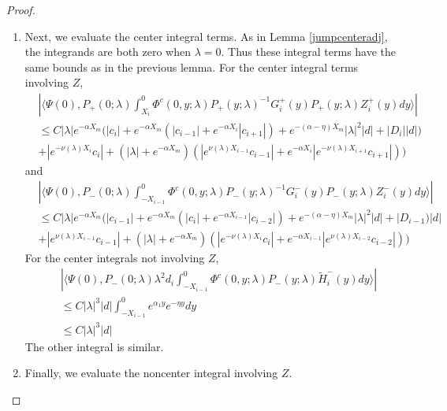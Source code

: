 \documentclass[thesis.tex]{subfiles}
\begin{document}
\begin{lemma}
\begin{proof}
\begin{enumerate}
\item Next, we evaluate the center integral terms. As in Lemma \ref{jumpcenteradj}, the integrands are both zero when $\lambda = 0$. Thus these integral terms have the same bounds as in the previous lemma. For the center integral terms involving $Z$,
\begin{align*}
&\left| \langle \Psi(0), P_+(0; \lambda) \int_{X_i}^0 \Phi^c(0, y; \lambda) P_+(y; \lambda)^{-1} G_i^+(y) P_+(y; \lambda) Z_i^+(y) dy \rangle \right| \\
&\leq C |\lambda| e^{-\alpha X_m}\Big(|c_i| + e^{-\alpha X_m}(|c_{i-1}| + e^{-\alpha X_i} |c_{i+1}|) + e^{-(\alpha - \eta) X_m}|\lambda|^2|d| + |D_i||d|) \\
&+ |e^{-\nu(\lambda)X_i} c_i| + (|\lambda| + e^{-\alpha X_m})(|e^{\nu(\lambda)X_{i-1}} c_{i-1}| + e^{-\alpha X_i} |e^{-\nu(\lambda)X_{i+1}} c_{i+1}|)\Big)
\end{align*}
and
\begin{align*}
&\left| \langle \Psi(0), P_-(0; \lambda) \int_{-X_{i-1}}^0 \Phi^c(0, y; \lambda) P_-(y; \lambda)^{-1} G_i^-(y) P_-(y; \lambda)Z_i^-(y) dy \rangle \right| \\
&\leq C |\lambda| e^{-\alpha X_m} \Big(|c_{i-1}| + e^{-\alpha X_m}(|c_i| + e^{-\alpha X_{i-1}} |c_{i-2}|) + e^{-(\alpha - \eta) X_m}|\lambda|^2|d| + |D_{i-1})|d| \\
&+ |e^{\nu(\lambda)X_{i-1}}c_{i-1}| + (|\lambda| + e^{-\alpha X_m})(|e^{-\nu(\lambda)X_i} c_i| + e^{-\alpha X_{i-1}} |e^{\nu(\lambda)X_{i-2}} c_{i-2}|)\Big)
\end{align*}
For the center integrals not involving $Z$, 
\begin{align*}
&\left| \langle \Psi(0), P_-(0; \lambda) \lambda^2 d_i \int_{-X_{i-1}}^0 \Phi^c(0, y; \lambda) P_-(y; \lambda) \tilde{H}_i^-(y) dy \rangle \right| \\
&\leq C |\lambda|^3 |d| \int_{-X_{i-1}}^0 e^{\alpha_1 y} e^{-\eta y} dy \\
&\leq C |\lambda|^3 |d| 
\end{align*}
The other integral is similar.

\item Finally, we evaluate the noncenter integral involving $Z$.


\end{enumerate}
\end{proof}
\end{lemma}
\end{document}
